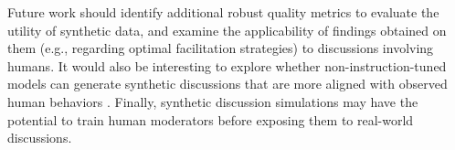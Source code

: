 %

Future work should identify additional robust quality metrics to evaluate the utility of synthetic data, and examine the applicability of findings obtained on  them (e.g., regarding optimal facilitation strategies) to discussions involving humans. It would also be interesting to explore whether non-instruction-tuned models can generate synthetic discussions that are more aligned with observed human behaviors \cite{anthis_2025}. Finally, synthetic discussion simulations may have the potential to train human moderators before exposing them to real-world discussions.